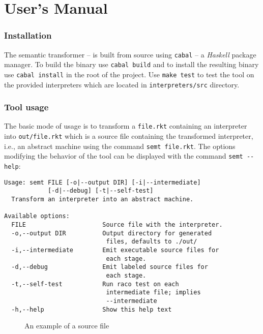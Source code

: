 \chapter{User's Manual}\label{chapter:user-manual}
\subsection*{Installation}
The semantic transformer -- \semt{} is built from source using \lstinline!cabal! -- a \textit{Haskell} package manager.
To build the binary use \lstinline!cabal build! and to install the resulting binary use \lstinline!cabal install! in the root of the project.
Use \lstinline!make test! to test the tool on the provided interpreters which are located in \lstinline!interpreters/src! directory.

\subsection*{Tool usage}
The basic mode of usage is to transform a \lstinline!file.rkt! containing an interpreter into \lstinline!out/file.rkt! which is a source file containing the transformed interpreter, i.e., an abstract machine using the command \lstinline!semt file.rkt!.
The options modifying the behavior of the tool can be displayed with the command \lstinline!semt --help!:
\begin{lstlisting}
Usage: semt FILE [-o|--output DIR] [-i|--intermediate] 
            [-d|--debug] [-t|--self-test]
  Transform an interpreter into an abstract machine.

Available options:
  FILE                     Source file with the interpreter.
  -o,--output DIR          Output directory for generated
                            files, defaults to ./out/
  -i,--intermediate        Emit executable source files for
                            each stage.
  -d,--debug               Emit labeled source files for
                            each stage.
  -t,--self-test           Run raco test on each
                            intermediate file; implies
                            --intermediate
  -h,--help                Show this help text
\end{lstlisting}

\begin{figure}
  
  \caption{An example of a source file}
  \label{fig:idl-example}
\end{figure}

